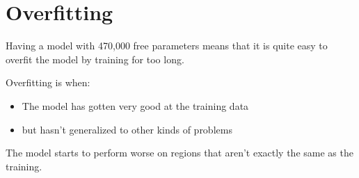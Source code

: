 \documentclass[letterpaper,10pt,english]{sphinxmanual}
\begin{document}
\begin{sphinxVerbatim}[commandchars=\\\{\}]
 
  \PYG{p}{[}   \PYG{p}{]}
             

\end{sphinxVerbatim}

\noindent{}


\section{Overfitting}
\label{\detokenize{05-SupervisedSegmentation:overfitting}}
\sphinxAtStartPar
Having a model with 470,000 free parameters means that it is quite easy to overfit the model by training for too long.

\sphinxAtStartPar
Overfitting is when:
\begin{itemize}
\item {} 
\sphinxAtStartPar
The model has gotten very good at the training data

\item {} 
\sphinxAtStartPar
but hasn’t generalized to other kinds of problems

\end{itemize}

\sphinxAtStartPar
{} The model starts to perform worse on regions that aren’t exactly the same as the training.
\end{document}

